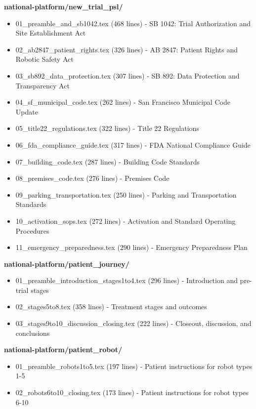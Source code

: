 \noindent\textbf{national-platform/new\_trial\_psl/}
\begin{itemize}[nosep]
  \item 01\_preamble\_and\_sb1042.tex (468 lines) - SB 1042: Trial
    Authorization and Site Establishment Act
  \item 02\_ab2847\_patient\_rights.tex (326 lines) - AB 2847: Patient Rights
    and Robotic Safety Act
  \item 03\_sb892\_data\_protection.tex (307 lines) - SB 892: Data Protection
    and Transparency Act
  \item 04\_sf\_municipal\_code.tex (262 lines) - San Francisco Municipal Code
    Update
  \item 05\_title22\_regulations.tex (322 lines) - Title 22 Regulations
  \item 06\_fda\_compliance\_guide.tex (317 lines) - FDA National Compliance
    Guide
  \item 07\_building\_code.tex (287 lines) - Building Code Standards
  \item 08\_premises\_code.tex (276 lines) - Premises Code
  \item 09\_parking\_transportation.tex (250 lines) - Parking and
    Transportation Standards
  \item 10\_activation\_sops.tex (272 lines) - Activation and Standard
    Operating Procedures
  \item 11\_emergency\_preparedness.tex (290 lines) - Emergency Preparedness
    Plan
\end{itemize}

\noindent\textbf{national-platform/patient\_journey/}
\begin{itemize}[nosep]
  \item 01\_preamble\_introduction\_stages1to4.tex (296 lines) - Introduction
    and pre-trial stages
  \item 02\_stages5to8.tex (358 lines) - Treatment stages and outcomes
  \item 03\_stages9to10\_discussion\_closing.tex (222 lines) - Closeout,
    discussion, and conclusions
\end{itemize}

\noindent\textbf{national-platform/patient\_robot/}
\begin{itemize}[nosep]
  \item 01\_preamble\_robots1to5.tex (197 lines) - Patient instructions for
    robot types 1-5
  \item 02\_robots6to10\_closing.tex (173 lines) - Patient instructions for
    robot types 6-10
\end{itemize}

